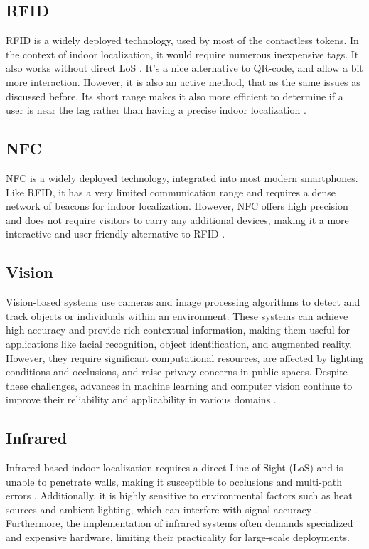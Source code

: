 \subsection{RFID}

RFID is a widely deployed technology, used by most of the contactless tokens. In the context of indoor localization, it would require numerous inexpensive tags. It also works without direct LoS \cite{mainetti_survey_2014}. It's a nice alternative to QR-code, and allow a bit more interaction. However, it is also an active method, that as the same issues as discussed before. Its short range makes it also more efficient to determine if a user is near the tag rather than having a precise indoor localization \cite{shang_overview_2022}. 

\subsection{NFC}

NFC is a widely deployed technology, integrated into most modern smartphones. Like RFID, it has a very limited communication range and requires a dense network of beacons for indoor localization. However, NFC offers high precision and does not require visitors to carry any additional devices, making it a more interactive and user-friendly alternative to RFID \cite{cai_museum_2015}. 

\subsection{Vision}

Vision-based systems use cameras and image processing algorithms to detect and track objects or individuals within an environment. These systems can achieve high accuracy and provide rich contextual information, making them useful for applications like facial recognition, object identification, and augmented reality. However, they require significant computational resources, are affected by lighting conditions and occlusions, and raise privacy concerns in public spaces. Despite these challenges, advances in machine learning and computer vision continue to improve their reliability and applicability in various domains \cite{mainetti_survey_2014}. 

\subsection{Infrared}

Infrared-based indoor localization requires a direct Line of Sight (LoS) and is unable to penetrate walls, making it susceptible to occlusions and multi-path errors \cite{mainetti_survey_2014}. Additionally, it is highly sensitive to environmental factors such as heat sources and ambient lighting, which can interfere with signal accuracy \cite{shang_overview_2022}. Furthermore, the implementation of infrared systems often demands specialized and expensive hardware, limiting their practicality for large-scale deployments.

